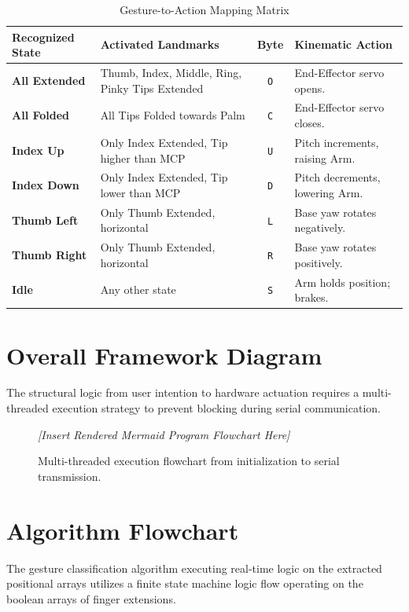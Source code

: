 \documentclass[conference]{IEEEtran}
\begin{document}
\begin{table}[H]
    \centering
    \caption{Gesture-to-Action Mapping Matrix}
    \label{tab:gesture_mapping}
    \begin{tabularx}{\linewidth}{>{\raggedright\arraybackslash}p{2.3cm} >{\raggedright\arraybackslash}p{3cm} c X}
        \toprule
        \textbf{Recognized State} & \textbf{Activated Landmarks} & \textbf{Byte} & \textbf{Kinematic Action} \\ \midrule
        \textbf{All Extended} & Thumb, Index, Middle, Ring, Pinky Tips Extended & \texttt{O} & End-Effector servo opens. \\
        \textbf{All Folded} & All Tips Folded towards Palm & \texttt{C} & End-Effector servo closes. \\
        \textbf{Index Up} & Only Index Extended, Tip higher than MCP & \texttt{U} & Pitch increments, raising Arm. \\
        \textbf{Index Down} & Only Index Extended, Tip lower than MCP & \texttt{D} & Pitch decrements, lowering Arm. \\
        \textbf{Thumb Left} & Only Thumb Extended, horizontal & \texttt{L} & Base yaw rotates negatively. \\
        \textbf{Thumb Right} & Only Thumb Extended, horizontal & \texttt{R} & Base yaw rotates positively. \\
        \textbf{Idle} & Any other state & \texttt{S} & Arm holds position; brakes. \\ \bottomrule
    \end{tabularx}
\end{table}

\section{Overall Framework Diagram}
The structural logic from user intention to hardware actuation requires a multi-threaded execution strategy to prevent blocking during serial communication.

\begin{figure}[H]
    \centering
    \textit{[Insert Rendered Mermaid Program Flowchart Here]}
    \caption{Multi-threaded execution flowchart from initialization to serial transmission.}
    \label{fig:flowchart}
\end{figure}

\section{Algorithm Flowchart}
The gesture classification algorithm executing real-time logic on the extracted positional arrays utilizes a finite state machine logic flow operating on the boolean arrays of finger extensions. 
\end{document}
